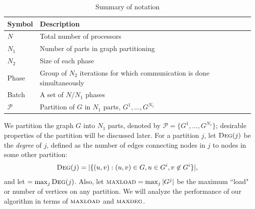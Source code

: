 \begin{table}[ht]
\centering \caption{\small Summary of notation}
\vspace{-.1in}
\label{table:notation-proposed}
\begin{tabular}{|l|p{3in}|}
\hline
\textbf{Symbol}  & \textbf{Description} \\
\hline
$N$ & Total number of processors\\
\hline
$N_1$ & Number of parts in graph partitioning\\
\hline
$N_2$ & Size of each phase\\
\hline
Phase & Group of $N_2$ iterations for which communication is done simultaneously\\
\hline
Batch & A set of $N/N_1$ phases\\
\hline
$\mathcal{P}$ & Partition of $G$ in $N_1$ parts, $G^1, \ldots, G^{N_1}$\\
\hline
\end{tabular}
\end{table}

We partition the graph $G$ into $N_1$ parts, denoted by
$\mathcal{P}=\{G^1, \ldots, G^{N_1}\}$; desirable properties of the partition will be discussed later. For a partition $j$, let $\textsc{Deg}(j)$ be the \emph{degree} of $j$, defined as the number of edges connecting nodes in $j$ to nodes in some other partition:
$$
\textsc{Deg}(j) = |\{(u, v): (u, v) \in G, u \in G^i, v \not \in G^i\}|,
$$
and let \maxdeg{} $ = \max_{j} \textsc{Deg}(j)$. Also, let $\textsc{maxload}{} = \max_j |G^j|$ be the maximum ``load" or number of vertices on any partition. We will analyze the performance of our algorithm in terms of $\textsc{maxload}{}$ and $\textsc{maxdeg}{}$.


